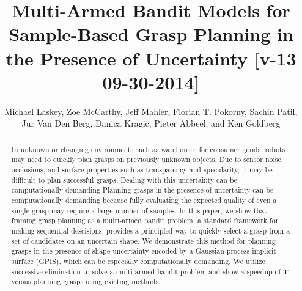 \documentclass[letterpaper, 10 pt, conference]{ieeeconf}  %
\title{\LARGE \bf
Multi-Armed Bandit Models for Sample-Based Grasp Planning in the Presence of Uncertainty [v-13 09-30-2014]}
\author{Michael Laskey, Zoe McCarthy, Jeff Mahler, Florian T. Pokorny, Sachin Patil,\\ Jur Van Den Berg,  Danica Kragic, Pieter Abbeel, and Ken Goldberg}%
\begin{document}
\maketitle
\thispagestyle{empty}
\pagestyle{empty}




\begin{abstract}
In unknown or changing environments such as warehouses for consumer goods, robots may need to quickly plan grasps on previously unknown objects.
Due to sensor noise, occlusions, and surface properties such as transparency and specularity, it may be difficult to plan successful grasps.
Dealing with this uncertainty can be computationally demanding
Planning grasps in the presence of uncertainty can be computationally demanding because fully evaluating the expected quality of even a single grasp may require a large number of samples.
In this paper, we show that framing grasp planning as a multi-armed bandit problem, a standard framework for making sequential descisions, provides a principled way to quickly select a grasp from a set of candidates on an uncertain shape.
We demonstrate this method for planning grasps in the presence of shape uncertainty encoded by a Gaussian process implicit surface (GPIS), which can be especially computationally demanding.
We utilize successive elimination to solve a multi-armed bandit problem and show a speedup of T versus planning grasps using existing methods.
\end{abstract}
\end{document}
